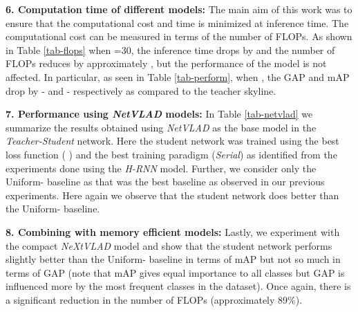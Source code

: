 \documentclass[10pt,twocolumn,letterpaper]{article}
\newcommand{\uni}[1]{Uniform-}
\begin{document}
\noindent\textbf{6. Computation time of different models:} 
The main aim of this work was to ensure that the computational cost and time is minimized at inference time. The computational cost can be measured in terms of the number of FLOPs. As shown in Table \ref{tab-flops} when =30, the inference time drops by  and the number of FLOPs reduces by approximately , but the performance of the model is not affected. In particular, as seen in Table \ref{tab-perform}, when , the GAP and mAP drop by - and - respectively as compared to the teacher skyline. 

\noindent\textbf{7. Performance using \textit{NetVLAD} models:} 
In Table \ref{tab-netvlad} we summarize the results obtained using \textit{NetVLAD} as the base model in the \textit{Teacher-Student} network. Here the student network was trained using the best loss function ( ) and the best training paradigm (\textit{Serial}) as identified from the experiments done using the \textit{H-RNN} model. Further, we consider only the \uni{k} baseline as that was the best baseline as observed in our previous experiments. Here again we observe that the student network does better than the \uni{k} baseline. 

\noindent\textbf{8. Combining with memory efficient models:} 
Lastly, we experiment with the compact \textit{NeXtVLAD} model and show that the student network performs slightly better than the \uni{k} baseline in terms of mAP but not so much in terms of GAP (note that mAP gives equal importance to all classes but GAP is influenced more by the most frequent classes in the dataset). Once again, there is a significant reduction in the number of FLOPs (approximately 89\%). 

\begin{comment}
\begin{figure*}[b]
\centering
\texttt{[image: latex/diagrams/model.png]}
\caption{\label{diagram2} Architecture of \textsc{Teacher-Student} network for video classification}
\end{figure*}
\end{comment}
\end{document}

